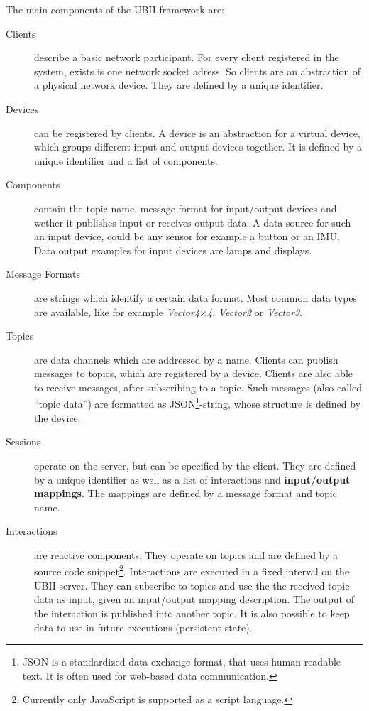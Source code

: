 The main components of the \ac{UBII} framework are:
\begin{description}
	\item[Clients] describe a basic network participant. For every client registered in the system, exists is one network socket adress. So clients are an abstraction of a physical network device. They are defined by a unique identifier. 
	\item[Devices] can be registered by clients. A device is an abstraction for a virtual device, which groups different input and output devices together. It is defined by a unique identifier and a list of components.
  \item[Components] contain the topic name, message format for input/output devices and wether it publishes input or receives output data. A data source for such an input device, could be any sensor for example a button or an \ac{IMU}. Data output examples for input devices are lamps and displays.
  \item[Message Formats] are strings which identify a certain data format. Most common data types are available, like for example \textit{Vector4\( \times \)4}, \textit{Vector2} or \textit{Vector3}.
	\item[Topics] are data channels which are addressed by a name. Clients can publish messages to topics, which are registered by a device. Clients are also able to receive messages, after subscribing to a topic. Such messages (also called \enquote{topic data}) are formatted as JSON\footnote{JSON is a standardized data exchange format, that uses human-readable text. It is often used for web-based data communication.}-string, whose structure is defined by the device.
	\item[Sessions] operate on the server, but can be specified by the client. They are defined by a unique identifier as well as a list of interactions and \textbf{input/output mappings}. The mappings are defined by a message format and topic name.
	\item[Interactions] are reactive components. They operate on topics and are defined by a source code snippet\footnote{Currently only JavaScript is supported as a script language.}. Interactions are executed in a fixed interval on the \ac{UBII} server. They can subscribe to topics and use the the received topic data as input, given an input/output mapping description. The output of the interaction is published into another topic. It is also possible to keep data to use in future executions (persistent state).
\end{description}

